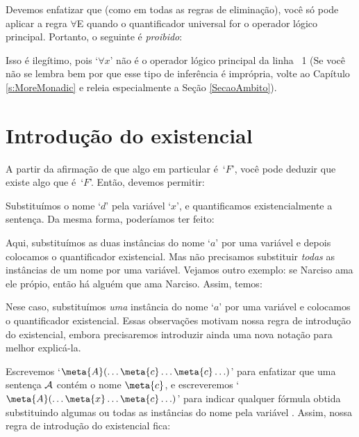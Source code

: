 Devemos enfatizar que (como em todas as regras de eliminação), você só pode aplicar a regra $\forall$E quando o quantificador universal for o operador lógico principal. Portanto, o seguinte é \emph{proibido}:
\begin{fitchproof}
\end{fitchproof}
Isso é ilegítimo, pois `$\forall x$' não é o  operador lógico principal da linha ~1  (Se você não se lembra bem por que esse tipo de inferência é imprópria, volte ao Capítulo \ref{s:MoreMonadic} e releia especialmente a Seção \ref{SecaoAmbito}).



\section{Introdução do existencial}
A partir da afirmação de que algo em particular é~`$F$', você pode deduzir que existe algo que é~`$F$'. Então, devemos permitir:
\begin{fitchproof}
	 
\end{fitchproof}
 
Substituímos o nome `$d$' pela variável `$x$',  e quantificamos existencialmente a sentença. Da mesma forma,  poderíamos ter feito:
\begin{fitchproof}
	 
\end{fitchproof}
Aqui,  substituímos as duas instâncias do nome `$a$' por uma variável e depois colocamos o quantificador existencial. Mas não precisamos substituir  \emph{todas}  as instâncias de um nome por  uma variável.  Vejamos outro exemplo: se Narciso ama ele própio, então há alguém que ama Narciso. Assim, temos:
\begin{fitchproof}
	 
\end{fitchproof}
Nese caso, substituímos \emph{uma} instância do nome `$a$' por uma variável e colocamos o quantificador existencial. Essas observações motivam nossa regra de introdução do existencial, embora precisaremos introduzir ainda uma nova notação para melhor explicá-la.

Escrevemos `$\meta{A}(\ldots \meta{c} \ldots \meta{c}\ldots)$' para enfatizar que uma sentença $\mathcal{A}$ contém o nome $\meta{c}$, e escreveremos `$\meta{A}(\ldots \meta{x} \ldots \meta{c}\ldots)$' para indicar qualquer fórmula obtida substituindo algumas ou todas as instâncias do nome   pela variável . Assim, nossa regra de introdução do existencial fica:
 
